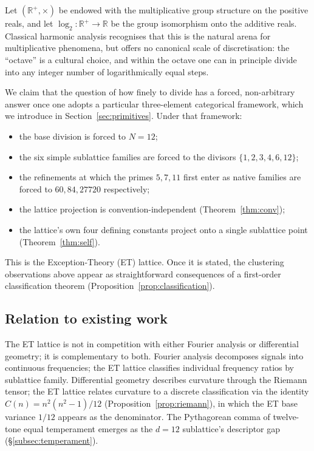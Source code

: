 \documentclass[11pt,a4paper]{article}
\theoremstyle{definition}
\theoremstyle{remark}
\newcommand{\R}{\mathbb{R}}
\begin{document}
Let $(\R^{+},\times)$ be endowed with the multiplicative group structure on the positive reals, and let $\log_{2}:\R^{+}\to\R$ be the group isomorphism onto the additive reals. Classical harmonic analysis recognises that this is the natural arena for multiplicative phenomena, but offers no canonical scale of discretisation: the ``octave'' is a cultural choice, and within the octave one can in principle divide into any integer number of logarithmically equal steps.

We claim that the question of how finely to divide has a forced, non-arbitrary answer once one adopts a particular three-element categorical framework, which we introduce in Section~\ref{sec:primitives}. Under that framework:
\begin{itemize}[leftmargin=*]
\item the base division is forced to $N=12$;
\item the six simple sublattice families are forced to the divisors $\{1,2,3,4,6,12\}$;
\item the refinements at which the primes $5,7,11$ first enter as native families are forced to $60,84,27720$ respectively;
\item the lattice projection is convention-independent (Theorem~\ref{thm:conv});
\item the lattice's own four defining constants project onto a single sublattice point (Theorem~\ref{thm:self}).
\end{itemize}

This is the Exception-Theory (ET) lattice. Once it is stated, the clustering observations above appear as straightforward consequences of a first-order classification theorem (Proposition~\ref{prop:classification}).

\subsection{Relation to existing work}

The ET lattice is not in competition with either Fourier analysis or differential geometry; it is complementary to both. Fourier analysis decomposes signals into continuous frequencies; the ET lattice classifies individual frequency ratios by sublattice family. Differential geometry describes curvature through the Riemann tensor; the ET lattice relates curvature to a discrete classification via the identity $C(n) = n^{2}(n^{2}-1)/12$ (Proposition~\ref{prop:riemann}), in which the ET base variance $1/12$ appears as the denominator. The Pythagorean comma of twelve-tone equal temperament emerges as the $d=12$ sublattice's descriptor gap (\S\ref{subsec:temperament}).
\end{document}
